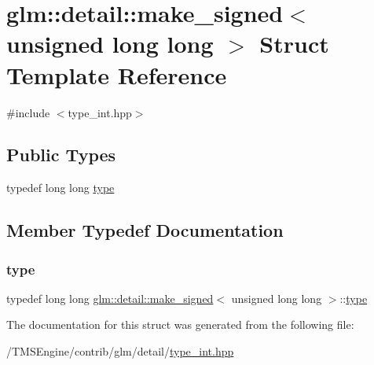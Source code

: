 \hypertarget{structglm_1_1detail_1_1make__signed_3_01unsigned_01long_01long_01_4}{}\section{glm\+:\+:detail\+:\+:make\+\_\+signed$<$ unsigned long long $>$ Struct Template Reference}
\label{structglm_1_1detail_1_1make__signed_3_01unsigned_01long_01long_01_4}


{\ttfamily \#include $<$type\+\_\+int.\+hpp$>$}

\subsection*{Public Types}
\begin{DoxyCompactItemize}
\item 
typedef long long \hyperlink{structglm_1_1detail_1_1make__signed_3_01unsigned_01long_01long_01_4_a025f1f9880bc973147ffb0371771eb0b}{type}
\end{DoxyCompactItemize}


\subsection{Member Typedef Documentation}
\mbox{\label{structglm_1_1detail_1_1make__signed_3_01unsigned_01long_01long_01_4_a025f1f9880bc973147ffb0371771eb0b}} 
\subsubsection{\texorpdfstring{type}{type}}
{\footnotesize\ttfamily typedef long long \hyperlink{structglm_1_1detail_1_1make__signed}{glm\+::detail\+::make\+\_\+signed}$<$ unsigned long long $>$\+::\hyperlink{structglm_1_1detail_1_1make__signed_3_01unsigned_01long_01long_01_4_a025f1f9880bc973147ffb0371771eb0b}{type}}



The documentation for this struct was generated from the following file\+:\begin{DoxyCompactItemize}
\item 
/\+T\+M\+S\+Engine/contrib/glm/detail/\hyperlink{type__int_8hpp}{type\+\_\+int.\+hpp}\end{DoxyCompactItemize}
